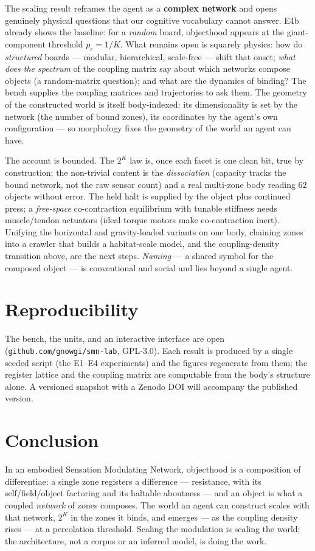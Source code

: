 \documentclass[11pt]{article}
\begin{document}
The scaling result reframes the agent as a \textbf{complex network} and opens
genuinely physical questions that our cognitive vocabulary cannot answer. E4b
already shows the baseline: for a \emph{random} board, objecthood appears at the
giant-component threshold $p_c = 1/K$. What remains open is squarely physics: how
do \emph{structured} boards --- modular, hierarchical, scale-free --- shift that
onset; \emph{what does the spectrum} of the coupling matrix say about which
networks compose objects (a random-matrix question); and what are the dynamics of
binding? The bench supplies the coupling matrices and trajectories to ask them.
The geometry of the
constructed world is itself body-indexed: its dimensionality is set by the network
(the number of bound zones), its coordinates by the agent's own configuration ---
so morphology fixes the geometry of the world an agent can have.

The account is bounded. The $2^{K}$ law is, once each facet is one clean bit,
true by construction; the non-trivial content is the \emph{dissociation} (capacity
tracks the bound network, not the raw sensor count) and a real multi-zone body
reading $62$ objects without error. The held halt is supplied by the object plus
continued press; a \emph{free-space} co-contraction equilibrium with tunable
stiffness needs muscle/tendon actuators (ideal torque motors make co-contraction
inert). Unifying the horizontal and gravity-loaded variants on one body, chaining
zones into a crawler that builds a habitat-scale model, and the coupling-density
transition above, are the next steps. \emph{Naming} --- a shared symbol for the
composed object --- is conventional and social and lies beyond a single agent.

\section{Reproducibility}

The bench, the units, and an interactive interface are open
(\texttt{github.com/gnowgi/smn-lab}, GPL-3.0). Each result is produced by a single
seeded script (the E1--E4 experiments) and the figures regenerate from them; the
register lattice and the coupling matrix are computable from the body's structure
alone. A versioned snapshot with a Zenodo DOI will accompany the published
version.

\section{Conclusion}

In an embodied Sensation Modulating Network, objecthood is a composition of
differentiae: a single zone registers a difference --- resistance, with its
self/field/object factoring and its haltable aboutness --- and an object is what a
coupled \emph{network} of zones composes. The world an agent can construct scales
with that network, $2^{K}$ in the zones it binds, and emerges --- as the coupling
density rises --- at a percolation threshold. Scaling the modulation is scaling
the world; the architecture, not a corpus or an inferred model, is doing the work.



\end{document}
